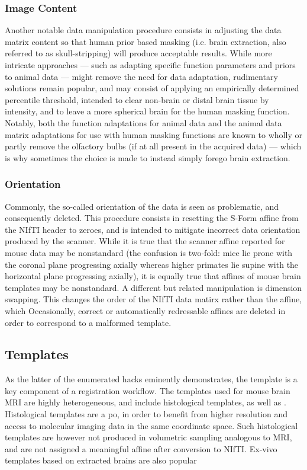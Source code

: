 \subsubsection*{Image Content}
Another notable data manipulation procedure consists in adjusting the data matrix content so that human prior based masking (i.e. brain extraction, also referred to as skull-stripping) will produce acceptable results.
While more intricate approaches --- such as adapting specific function parameters and priors to animal data \cite{rbet} --- might remove the need for data adaptation, rudimentary solutions remain popular, and may consist of applying an empirically determined percentile threshold, intended to clear non-brain or distal brain tissue by intensity, and to leave a more spherical brain for the human masking function.
Notably, both the function adaptations for animal data and the animal data matrix adaptations for use with human masking functions are known to wholly or partly remove the olfactory bulbs (if at all present in the acquired data) --- which is why sometimes the choice is made to instead simply forego brain extraction.

\subsubsection*{Orientation}
Commonly, the so-called orientation of the data is seen as problematic, and consequently deleted.
This procedure consists in resetting the S-Form affine from the NIfTI header to zeroes, and is intended to mitigate incorrect data orientation produced by the scanner.
While it is true that the scanner affine reported for mouse data may be nonstandard (the confusion is two-fold: mice lie prone with the coronal plane progressing axially whereas higher primates lie supine with the horizontal plane progressing axially), it is equally true that affines of mouse brain templates may be nonstandard.
A different but related manipulation is dimension swapping.
This changes the order of the NIfTI data matirx rather than the affine, which 
Occasionally, correct or automatically redressable affines are deleted in order to correspond to a malformed template.

\subsection*{Templates}
As the latter of the enumerated hacks eminently demonstrates, the template is a key component of a registration workflow.
The templates used for mouse brain MRI are highly heterogeneous, and include histological templates, as well as .
Histological templates are a po, in order to benefit from higher resolution and access to molecular imaging data in the same coordinate space.
Such histological templates are however not produced in volumetric sampling analogous to MRI, and are not assigned a meaningful affine after conversion to NIfTI.
Ex-vivo templates based on extracted brains are also popular

